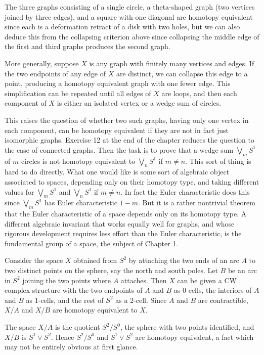 \begin{example}
\label{ex:graphs-collapsing-homotopy-equivalent}
The three graphs consisting of a single circle, a theta-shaped graph (two vertices
joined by three edges), and a square with one diagonal are homotopy equivalent since
each is a deformation retract of a disk with two holes, but we can also deduce this
from the collapsing criterion above since collapsing the middle edge of the first and
third graphs produces the second graph.

More generally, suppose $X$ is any graph with finitely many vertices and edges. If
the two endpoints of any edge of $X$ are distinct, we can collapse this edge to a point,
producing a homotopy equivalent graph with one fewer edge. This simplification can
be repeated until all edges of $X$ are loops, and then each component of $X$ is either
an isolated vertex or a wedge sum of circles.

This raises the question of whether two such graphs, having only one vertex in each
component, can be homotopy equivalent if they are not in fact just isomorphic graphs.
Exercise 12 at the end of the chapter reduces the question to the case of connected
graphs. Then the task is to prove that a wedge sum $\bigvee_m S^1$ of $m$ circles is not
homotopy equivalent to $\bigvee_n S^1$ if $m \ne n$. This sort of thing is hard to do directly.
What one would like is some sort of algebraic object associated to spaces, depending
only on their homotopy type, and taking different values for $\bigvee_m S^1$ and $\bigvee_n S^1$
if $m \ne n$. In fact the Euler characteristic does this since $\bigvee_m S^1$ has Euler
characteristic $1-m$. But it is a rather nontrivial theorem that the Euler characteristic
of a space depends only on its homotopy type. A different algebraic invariant that
works equally well for graphs, and whose rigorous development requires less effort
than the Euler characteristic, is the fundamental group of a space, the subject of
Chapter 1.
\end{example}

\begin{example}
\label{ex:sphere-two-points-identified}
Consider the space $X$ obtained from $S^2$ by attaching the two ends of an arc $A$
to two distinct points on the sphere, say the north and south poles. Let $B$ be an arc
in $S^2$ joining the two points where $A$ attaches. Then $X$ can be given a CW complex
structure with the two endpoints of $A$ and $B$ as 0-cells, the interiors of $A$ and $B$ as
1-cells, and the rest of $S^2$ as a 2-cell. Since $A$ and $B$ are contractible, $X/A$ and
$X/B$ are homotopy equivalent to $X$.



The space $X/A$ is the quotient $S^2/S^0$, the sphere with two points identified, and
$X/B$ is $S^1 \vee S^2$. Hence $S^2/S^0$ and $S^1 \vee S^2$ are homotopy equivalent, a fact
which may not be entirely obvious at first glance.
\end{example}

